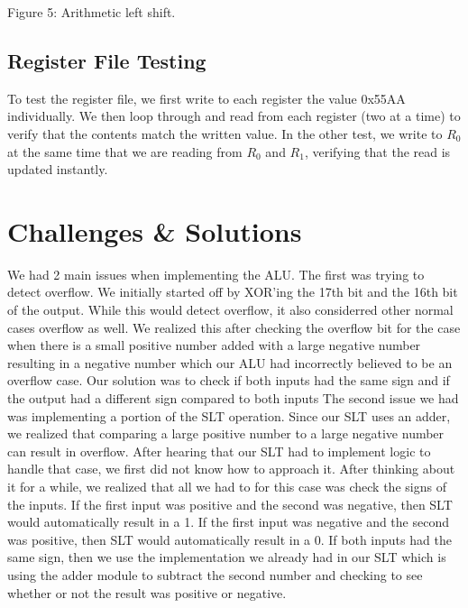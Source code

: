 \documentclass[11pt]{article}
\begin{document}
\hspace*{\fill}
Figure 5: Arithmetic left shift.
\hspace*{\fill}\newline

\subsection{Register File Testing}
To test the register file, we first write to each register the value 0x55AA individually. We then loop through and read from each register (two at a time) to verify that the contents match the written value. In the other test, we write to $R_0$ at the same time that we are reading from $R_0$ and $R_1$, verifying that the read is updated instantly. 

\section{Challenges \& Solutions}
We had 2 main issues when implementing the ALU. The first was trying to detect overflow. We initially started off by XOR'ing the 17th bit and the 16th bit of the output. While this would detect overflow, it also considerred other normal cases overflow as well. We realized this after checking the overflow bit for the case when there is a small positive number added with a large negative number resulting in a negative number which our ALU had incorrectly believed to be an overflow case. Our solution was to check if both inputs had the same sign and if the output had a different sign compared to both inputs The second issue we had was implementing a portion of the SLT operation. Since our SLT uses an adder, we realized that comparing a large positive number to a large negative number can result in overflow. After hearing that our SLT had to implement logic to handle that case, we first did not know how to approach it. After thinking about it for a while, we realized that all we had to for this case was check the signs of the inputs. If the first input was positive and the second was negative, then SLT would automatically result in a 1. If the first input was negative and the second was positive, then SLT would automatically result in a 0. If both inputs had the same sign, then we use the implementation we already had in our SLT which is using the adder module to subtract the second number and checking to see whether or not the result was positive or negative.
\end{document}
